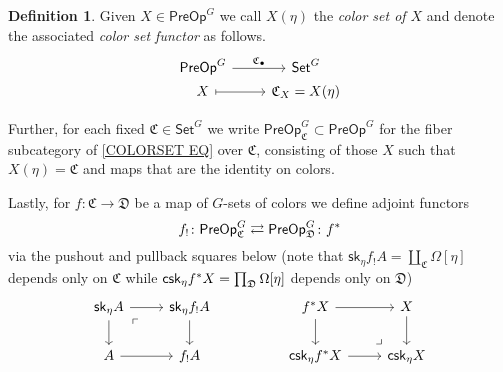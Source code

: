 \documentclass[a4paper,10pt
,draft
]{article}%
\numberwithin{equation}{section}
\numberwithin{figure}{section}
\theoremstyle{definition} %
\newtheorem{definition}[equation]{Definition}%
\newcommand{\1}{\ensuremath{\mathbbm 1}}%
\begin{document}
\begin{definition}
	Given $X \in \mathsf{PreOp}^G$ we call $X(\eta)$ the 
	\emph{color set of $X$}
	and denote the associated \emph{color set functor} as follows.
	\begin{equation}\label{COLORSET EQ}
	\begin{tikzcd}[row sep=0]
	\mathsf{PreOp}^G \ar{r}{\mathfrak{C}_{\bullet}} &
	\mathsf{Set}^G
	\\
	X \ar[mapsto]{r} &
	\mathfrak{C}_X = X(\eta)
	\end{tikzcd}
	\end{equation}

Further, for each fixed $\mathfrak{C} \in \mathsf{Set}^G$ we write 
$\mathsf{PreOp}^G_{\mathfrak{C}} \subset \mathsf{PreOp}^G$
for the fiber subcategory of 
\eqref{COLORSET EQ}
over $\mathfrak{C}$,
consisting of those $X$
such that $X(\eta) = \mathfrak{C}$
and maps that are the identity on colors.	
	
	
	Lastly, for $f \colon \mathfrak{C} \to \mathfrak{D}$
	be a map of $G$-sets of colors
	we define adjoint functors
	\[
	f_{!} \colon
	\mathsf{PreOp}^{G}_{\mathfrak{C}}
	\rightleftarrows
	\mathsf{PreOp}^{G}_{\mathfrak{D}}
	\colon f^{\**}
	\]
	via the pushout and pullback squares below
	(note that 
	$\mathsf{sk}_{\eta} f_! A = \coprod_{\mathfrak{C}} \Omega[\eta]$ depends only on 
	$\mathfrak{C}$ while 
	$\mathsf{csk}_{\eta} f^{\**} X
	= \prod_{\mathfrak{D}} \Omega[\eta]$ depends only on
	$\mathfrak{D}$)
	\[
	\begin{tikzcd}
	\mathsf{sk}_{\eta} A \ar{r} \ar{d} \arrow[dr, phantom, "\ulcorner", very near start]  &
	\mathsf{sk}_{\eta} f_! A \ar{d}
	&&
	f^{\**} X \ar{r} \ar{d} &
	X \ar{d}
	\\
	A \ar{r} & 
	f_! A
	&&
	\mathsf{csk}_{\eta} f^{\**} X \ar{r} & 
	\mathsf{csk}_{\eta} X
	\arrow[ul, phantom, "\lrcorner", very near start]
	\end{tikzcd}
	\]
\end{definition}
\end{document}
